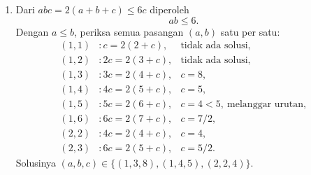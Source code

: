 \documentclass[12pt]{scrartcl}
\begin{document}
\begin{enumerate}[resume]
	\item Dari $abc = 2(a + b + c) \le 6c$ diperoleh
	\[ ab \le 6. \]
	Dengan $a \le b$, periksa semua pasangan $(a, b)$ satu per satu:
	\begin{align*}
	(1, 1) &: c = 2(2 + c), & \text{tidak ada solusi}, \\
	(1, 2) &: 2c = 2(3 + c), & \text{tidak ada solusi}, \\
	(1, 3) &: 3c = 2(4 + c), & c = 8, \\
	(1, 4) &: 4c = 2(5 + c), & c = 5, \\
	(1, 5) &: 5c = 2(6 + c), & c = 4 < 5, \ \text{melanggar urutan}, \\
	(1, 6) &: 6c = 2(7 + c), & c = 7/2, \\
	(2, 2) &: 4c = 2(4 + c), & c = 4, \\
	(2, 3) &: 6c = 2(5 + c), & c = 5/2.
	\end{align*}
	Solusinya $(a, b, c) \in \{(1, 3, 8), (1, 4, 5), (2, 2, 4)\}$.


\end{enumerate}
\end{document}
